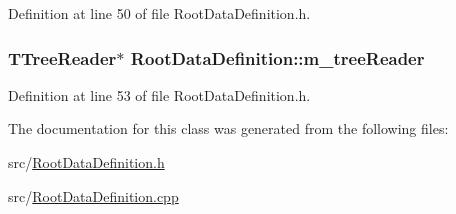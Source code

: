 Definition at line 50 of file Root\+Data\+Definition.\+h.

\hypertarget{classRootDataDefinition_a919827bdd245e61c0f54676d59cc7448}{
\subsubsection[{m\+\_\+tree\+Reader}]{\setlength{\rightskip}{0pt plus 5cm}T\+Tree\+Reader$\ast$ Root\+Data\+Definition\+::m\+\_\+tree\+Reader\hspace{0.3cm}{\ttfamily [protected]}}}\label{classRootDataDefinition_a919827bdd245e61c0f54676d59cc7448}


Definition at line 53 of file Root\+Data\+Definition.\+h.



The documentation for this class was generated from the following files\+:\begin{DoxyCompactItemize}
\item 
src/\hyperlink{RootDataDefinition_8h}{Root\+Data\+Definition.\+h}\item 
src/\hyperlink{RootDataDefinition_8cpp}{Root\+Data\+Definition.\+cpp}\end{DoxyCompactItemize}
